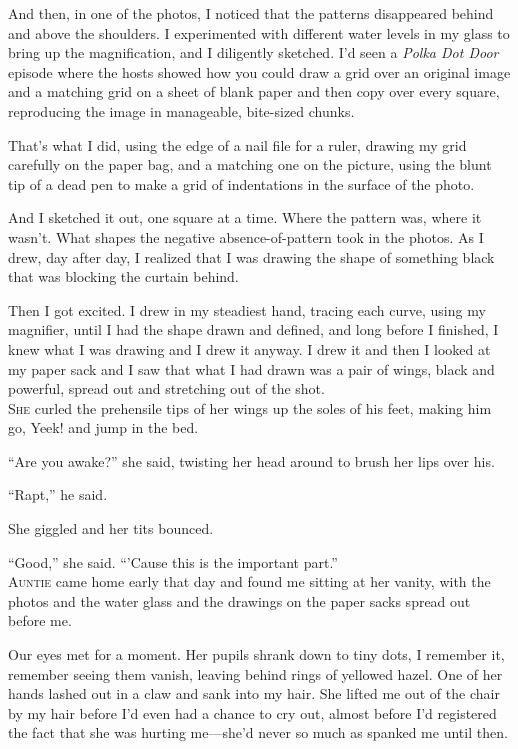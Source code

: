 And then, in one of the photos, I noticed that the patterns
disappeared behind and above the shoulders.  I experimented with
different water levels in my glass to bring up the magnification, and
I diligently sketched.  I'd seen a \textit{Polka Dot Door} episode
where the hosts showed how you could draw a grid over an original
image and a matching grid on a sheet of blank paper and then copy over
every square, reproducing the image in manageable, bite-sized chunks.

That's what I did, using the edge of a nail file for a ruler, drawing
my grid carefully on the paper bag, and a matching one on the picture,
using the blunt tip of a dead pen to make a grid of indentations in
the surface of the photo.

And I sketched it out, one square at a time.  Where the pattern was,
where it wasn't.  What shapes the negative absence-of-pattern took in
the photos.  As I drew, day after day, I realized that I was drawing
the shape of something black that was blocking the curtain behind.

Then I got excited.  I drew in my steadiest hand, tracing each curve,
using my magnifier, until I had the shape drawn and defined, and long
before I finished, I knew what I was drawing and I drew it anyway.  I
drew it and then I looked at my paper sack and I saw that what I had
drawn was a pair of wings, black and powerful, spread out and
stretching out of the shot.
\\
\lettrine[lines=3, lhang=.5, nindent=0pt, findent=2pt]{S}{he} curled the prehensile tips of her wings up the soles of his feet,
making him go, Yeek!  and jump in the bed.

``Are you awake?'' she said, twisting her head around to brush her
lips over his.

``Rapt,'' he said.

She giggled and her tits bounced.

``Good,'' she said.  ``'Cause this is the important part.''
\\
\lettrine[lines=3, lhang=.5, nindent=0pt, findent=2pt]{A}{untie} came home early that day and found me sitting at her vanity,
with the photos and the water glass and the drawings on the paper
sacks spread out before me.

Our eyes met for a moment.  Her pupils shrank down to tiny dots, I
remember it, remember seeing them vanish, leaving behind rings of
yellowed hazel.  One of her hands lashed out in a claw and sank into
my hair.  She lifted me out of the chair by my hair before I'd even
had a chance to cry out, almost before I'd registered the fact that
she was hurting me---she'd never so much as spanked me until then.

